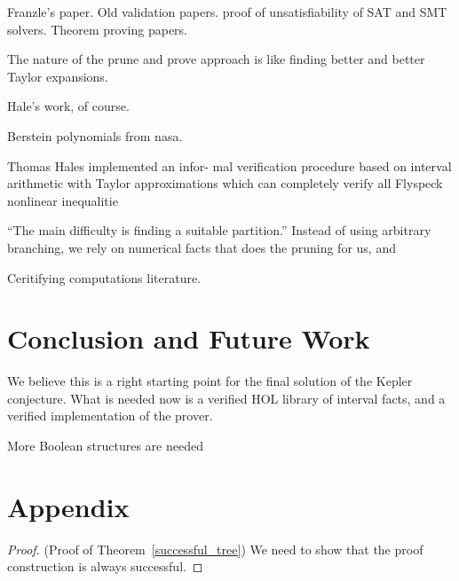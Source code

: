 \documentclass[envcountsect]{llncs}
\begin{document}
Franzle's paper. Old validation papers. proof of unsatisfiability of SAT and
SMT solvers. Theorem proving papers.

The nature of the prune and prove approach is like finding better and better
Taylor expansions. 

Hale's work, of course. 

Berstein polynomials from nasa. 

Thomas Hales implemented an infor-
mal verification procedure based on interval arithmetic with Taylor
approximations which
can completely verify all Flyspeck nonlinear inequalitie

``The main difficulty is finding a suitable partition.'' Instead of using
arbitrary branching, we rely on numerical facts that does the pruning for us,
and 

Ceritifying computations literature. 


\section{Conclusion and Future Work}

We believe this is a right starting point for the final solution of the Kepler
conjecture. What is needed now is a verified HOL library of interval facts, and
a verified implementation of the prover. 

More Boolean structures are needed 




\newpage
\section*{Appendix}


\begin{proof}(Proof of Theorem~\ref{successful_tree})
We need to show that the proof construction is always successful. 

\end{proof}
\end{document}
